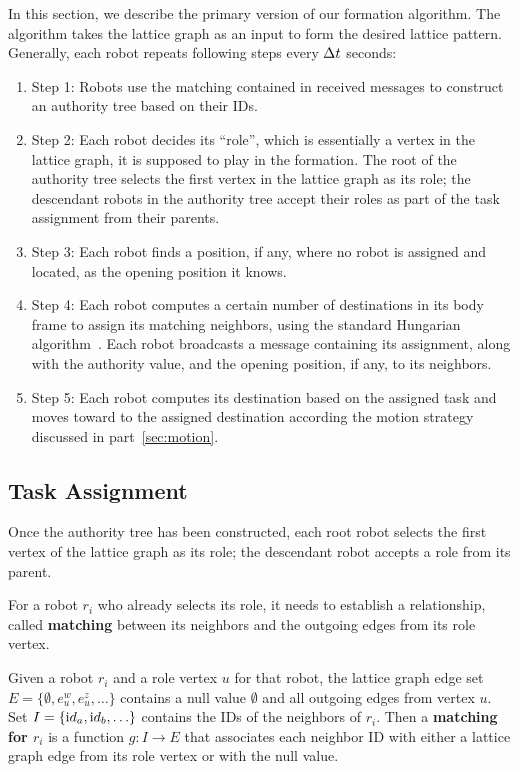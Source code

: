 In this section, we describe the primary version of our formation algorithm. 
%
The algorithm takes the lattice graph as an input to form the desired lattice pattern. 
%
Generally, each robot repeats following steps every $\Delta t$ seconds:
\begin{enumerate}
\item Step 1: Robots use the matching contained in received messages to
  construct an authority tree based on their IDs.
\item Step 2: Each robot decides its ``role'', which is essentially a vertex in the lattice graph, it is supposed to play in the formation.  
    The root of the authority tree selects the first vertex in the lattice graph as its role; 
    the descendant robots in the authority tree accept their roles as part of the task assignment from their parents. 
\item Step 3: Each robot finds a position, if any, where no robot is assigned and located, as the opening position it knows.
\item Step 4: Each robot computes a certain number of destinations in its body frame to
  assign its matching neighbors, using the standard Hungarian
  algorithm~\cite{Kuh55}. 
  Each robot broadcasts a message containing its assignment, along with the authority value, and the opening position, if any, to its neighbors.
\item Step 5: Each robot computes its destination based on the assigned task and moves toward to the assigned destination according the motion strategy discussed in part~\ref{sec:motion}.
\end{enumerate}

\subsection{Task Assignment}
\label{subsec:task}


Once the authority tree has been constructed, each root robot selects the first vertex of the lattice graph as its role; the descendant robot accepts a role from its parent.

For a robot $r_i$ who already selects its role, it needs to establish a
relationship, called \textbf{matching} between its neighbors and the outgoing edges from its role vertex. 
\begin{defn}
\label{def:matching}
  Given a robot $r_i$ and a role vertex $u$ for that robot, the lattice
  graph edge set
    $E=\{\emptyset, e_{u}^w, e_{u}^z, \ldots\}$
  contains a null value $\emptyset$ and all outgoing edges from vertex $u$.  
  Set
    $I=\{{\textrm id}_a, {\textrm id}_b, \ldots \}$
  contains the IDs of the neighbors of $r_i$.  
  Then a
  \textbf{matching for $r_i$} is a function $g : I \rightarrow E$ that
  associates each neighbor ID with either a lattice graph edge from its role vertex or with the null value.
\end{defn}

